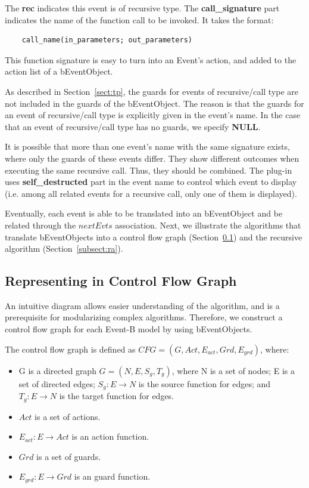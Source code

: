 \documentclass{easychair}
\begin{document}
The \textbf{rec} indicates this event is of recursive type. The \textbf{call\_signature} part indicates the name of the function call to be invoked. It takes the format:
\lstset{language=[68]Algol}
\begin{lstlisting}
	call_name(in_parameters; out_parameters)
\end{lstlisting} 
This function signature is easy to turn into an Event's action, and added to the action list of a bEventObject. 

As described in Section~\ref{sect:tp}, the guards for events of recursive/call type are not included in the guards of the bEventObject. The reason is that the guards for an event of recursive/call type is explicitly given in the event's name. In the case that an event of recursive/call type has no guards, we specify \textbf{NULL}. 

It is possible that more than one event's name with the same signature exists, where only the guards of these events differ. They show different outcomes when executing the same recursive call. Thus, they should be combined. The plug-in uses \textbf{self\_destructed} part in the event name to control which event to display (i.e. among all related events for a recursive call, only one of them is displayed). 

Eventually, each event is able to be translated into an bEventObject and be related through the $nextEvts$ association. Next, we illustrate the algorithms that translate bEventObjects into a control flow graph (Section~\ref{subsect:vis}) and the recursive algorithm (Section~\ref{subsect:ra}).


\subsection{Representing in Control Flow Graph} \label{subsect:vis}
An intuitive diagram allows easier understanding of the algorithm, and is a prerequisite for modularizing complex algorithms. Therefore, we construct a control flow graph for each Event-B model by using bEventObjects.

The control flow graph is defined as $CFG = (G, Act, E_{act}, Grd, E_{grd})$, where:
\begin{itemize}
	\item G is a directed graph $G = (N, E, S_g, T_g)$, where N is a set of nodes; E is a set of directed edges; $S_g : E \rightarrow N $ is the source function for edges; and $T_g : E \rightarrow N$ is the target function for edges.
	\item $Act$ is a set of actions.
	\item $E_{act} : E \rightarrow Act$ is an action function. 
	\item $Grd$ is a set of guards.
	\item $E_{grd} : E \rightarrow Grd$ is an guard function.
\end{itemize}
\end{document}
